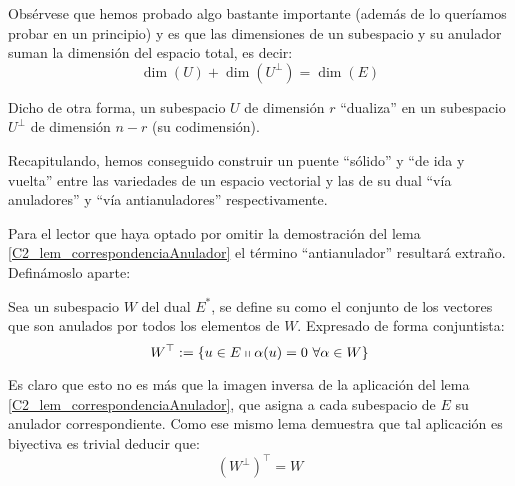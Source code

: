 \begin{obs}
	\label{C2_obs_dim_anulador}
	Obsérvese que hemos probado algo bastante importante (además de lo queríamos probar en un principio) y es que las dimensiones de un subespacio y su anulador suman la dimensión del espacio total, es decir:
	\begin{equation}\label{C2_eq_dim_anulador}
	\dim(U)+\dim(U^{\perp})=\dim(E)
	\end{equation}
	
	Dicho de otra forma, un subespacio $U$ de dimensión $r$ ``dualiza'' en un subespacio $U^\perp$ de dimensión $n-r$ (su codimensión).
\end{obs}

Recapitulando, hemos conseguido construir un puente ``sólido'' y ``de ida y vuelta'' entre las variedades de un espacio vectorial y las de su dual ``vía anuladores'' y ``vía antianuladores'' respectivamente.

Para el lector que haya optado por omitir la demostración del lema \ref{C2_lem_correspondenciaAnulador} el término ``antianulador'' resultará extraño. Definámoslo aparte:
\begin{defi}[Antianulador]
	Sea un subespacio $W$ del dual $E^*$, se define su  como el conjunto de los vectores que son anulados por todos los elementos de $W$. Expresado de forma conjuntista:
	\[W^\top:=\{u\in E\shortparallel \alpha(u)=0\ \forall\alpha\in W\}\]
\end{defi}

Es claro que esto no es más que la imagen inversa de la aplicación del lema \ref{C2_lem_correspondenciaAnulador}, que asigna a cada subespacio de $E$ su anulador correspondiente. Como ese mismo lema demuestra que tal aplicación es biyectiva es trivial deducir que:
\begin{equation}
	\label{C2_eq_involutividad}
	(W^{\perp})^{\top}=W
\end{equation}

